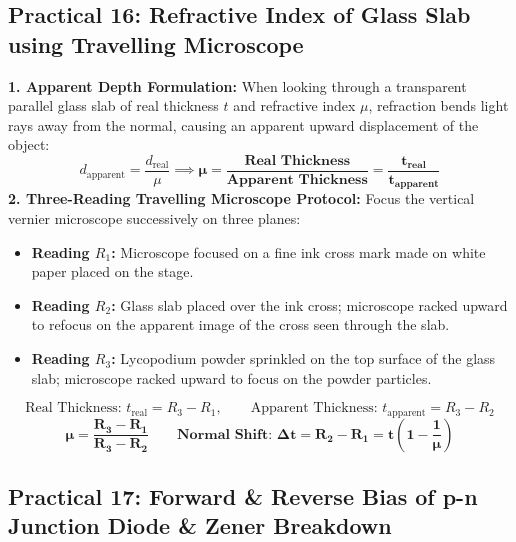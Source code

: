 \documentclass[10pt,twoside,openright]{book}
\begin{document}
\subsection{Practical 16: Refractive Index of Glass Slab using Travelling Microscope}

\begin{formulabox}
\textbf{1. Apparent Depth Formulation:}
When looking through a transparent parallel glass slab of real thickness $t$ and refractive index $\mu$, refraction bends light rays away from the normal, causing an apparent upward displacement of the object:
\begin{equation}
  d_{\text{apparent}} = \frac{d_{\text{real}}}{\mu} \implies \mathbf{\mu = \frac{\text{Real Thickness}}{\text{Apparent Thickness}} = \frac{t_{\text{real}}}{t_{\text{apparent}}}}
\end{equation}
\textbf{2. Three-Reading Travelling Microscope Protocol:}
Focus the vertical vernier microscope successively on three planes:
\begin{itemize}
  \item \textbf{Reading $R_1$:} Microscope focused on a fine ink cross mark made on white paper placed on the stage.
  \item \textbf{Reading $R_2$:} Glass slab placed over the ink cross; microscope racked upward to refocus on the apparent image of the cross seen through the slab.
  \item \textbf{Reading $R_3$:} Lycopodium powder sprinkled on the top surface of the glass slab; microscope racked upward to focus on the powder particles.
\end{itemize}
\begin{equation}
  \text{Real Thickness: } t_{\text{real}} = R_3 - R_1, \qquad \text{Apparent Thickness: } t_{\text{apparent}} = R_3 - R_2
\end{equation}
\begin{equation}
  \mathbf{\mu = \frac{R_3 - R_1}{R_3 - R_2}} \qquad \mathbf{\text{Normal Shift: } \Delta t = R_2 - R_1 = t\left(1 - \frac{1}{\mu}\right)}
\end{equation}
\end{formulabox}

\subsection{Practical 17: Forward \& Reverse Bias of p-n Junction Diode \& Zener Breakdown}
\end{document}
